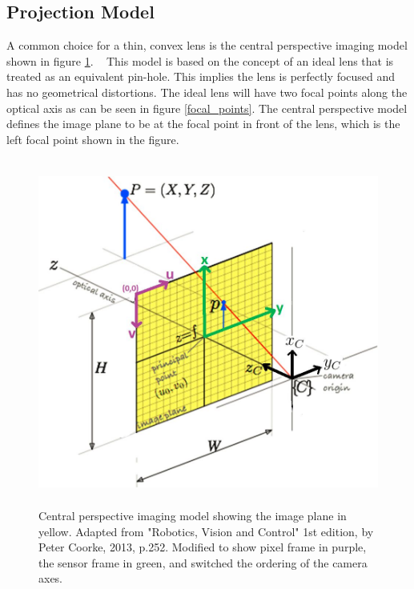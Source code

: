  \subsection{Projection Model}
 
 A common choice for a thin, convex lens is the central perspective imaging model shown in figure \ref{projection_model}. ~\citep{Coorke:2013} This model is based on the concept of an ideal lens that is treated as an equivalent pin-hole.  This implies the lens is perfectly focused and has no geometrical distortions.  The ideal lens will have two focal points along the optical axis as can be seen in figure \ref{focal_points}.  The central perspective model defines the image plane to be at the focal point in front of the lens, which is the left focal point shown in the figure.  
 
 \begin{figure}
 	\centering
     \includegraphics[height=4.5in]{figures/projection_model.jpg}
     \caption[Projection model]{Central perspective imaging model showing the image plane in yellow.  Adapted from "Robotics, Vision and Control" 1st edition, by Peter Coorke, 2013, p.252. Modified to show pixel frame in purple, the sensor frame in green, and switched the ordering of the camera axes.}
     \label{projection_model}
 \end{figure}

